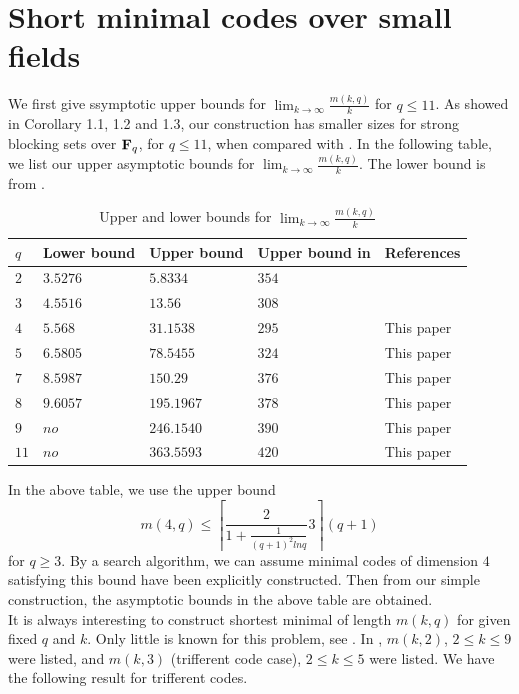 \documentclass[10pt,a4paper]{article}
\begin{document}
\section{Short minimal codes over small fields}


We first give ssymptotic upper bounds for $\lim_{k \longrightarrow \infty} \frac{m(k,q)}{k}$ for $ q \leq 11$. As showed in Corollary 1.1, 1.2 and 1.3, our construction has smaller sizes for strong blocking sets over ${\bf F}_q$, for $q \leq 11$, when compared with \cite[Table]{Alon}. In the following table, we list our upper asymptotic bounds for $\lim_{k \longrightarrow \infty} \frac{m(k,q)}{k}$. The lower bound is from \cite[Table 1]{Scotti}.\\

\begin{longtable}{|l|l|l|l|l|}
\caption{\label{tab:6-1} Upper and lower bounds for $\lim_{k \longrightarrow \infty}\frac{m(k,q)}{k}$}\\ \hline
$q$     & Lower bound &Upper bound&Upper bound in \cite{Alon}&References \\ \hline
$2$           & $3.5276$ &$5.8334$&$354$ & \cite{Borello}\\ \hline
$3$       & $4.5516$ &$13.56$&$308$ & \cite{Bishnoi}\\ \hline
$4$    & $5.568$ &$31.1538$&$295$& This paper \\ \hline
$5$ &$6.5805$ &$78.5455$&$324$& This paper\\ \hline
$7$ &$8.5987$&$150.29$ & $376$&This paper\\ \hline
$8$&$9.6057$&$195.1967$ &$378$&This paper\\ \hline
$9$ &$no$& $246.1540$ &$390$&This paper\\ \hline
$11$ &$no$& $363.5593$ &$420$&This paper\\ \hline
\end{longtable}	

In the above table, we use the upper bound $$m(4,q) \leq \left\lceil \frac{2}{1+\frac{1}{(q+1)^2ln q}}3\right\rceil (q+1)$$ for $q \geq 3$. By a search algorithm, we can assume minimal codes of dimension $4$ satisfying this bound have been explicitly constructed. Then from our simple construction, the asymptotic bounds in the above table are obtained.\\


It is always interesting to construct shortest minimal of length $m(k,q)$ for given fixed $q$ and $k$. Only little is known for this problem, see \cite{Kurz,Kurz1,Scotti1}. In \cite[Page 6]{Scotti1}, $m(k,2)$, $2 \leq k \leq 9$ were listed, and $m(k,3)$ (trifferent code case), $2\leq k \leq 5$ were listed.  We have the following result for trifferent codes.\\
\end{document}
